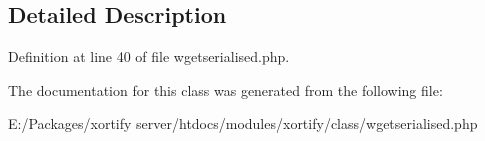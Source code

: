 \subsection{Detailed Description}


Definition at line 40 of file wgetserialised.\-php.



The documentation for this class was generated from the following file\-:\begin{DoxyCompactItemize}
\item 
E\-:/\-Packages/xortify server/htdocs/modules/xortify/class/wgetserialised.\-php\end{DoxyCompactItemize}

